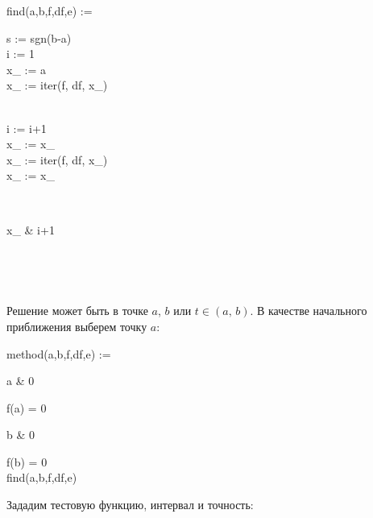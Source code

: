 \documentclass[a4paper, 14pt]{extarticle}
\begin{document}
\begin{preproc}
	find(a,b,f,df,e) := \begin{block}
		s := sgn(b-a)\\
		i := 1\\
		x_ := a\\
		x_ := iter(f, df, x_)\\
		\\
		\begin{block}
			i := i+1\\
			x_ := x_\\
			x_ := iter(f, df, x_)\\
			 x_ := x_\\
		\end{block}\\
		\begin{pmatrix}
			x_ & i+1
		\end{pmatrix}\\
	\end{block}\\
\end{preproc}
Решение может быть в точке $a$, $b$ или $t\in(a,\,b)$. В качестве начального приближения выберем точку $a$:
\begin{preproc}
	method(a,b,f,df,e) := \begin{caseblock}
		\begin{pmatrix}a & 0\end{pmatrix} \when f(a) = 0\\
		\begin{pmatrix}b & 0\end{pmatrix} \when f(b) = 0\\
		find(a,b,f,df,e) \otherwise\\
	\end{caseblock}
\end{preproc}
Зададим тестовую функцию, интервал и точность:
\end{document}
